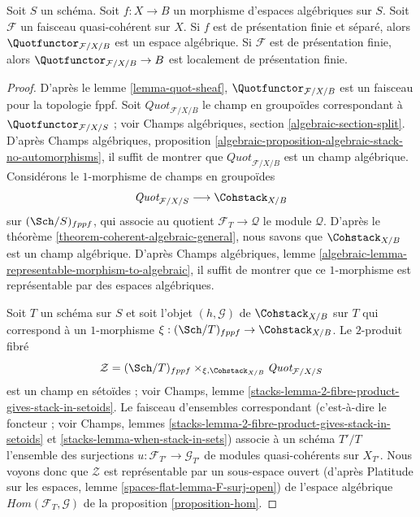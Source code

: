 \begin{proposition}
\label{proposition-quot}
Soit $S$ un schéma. Soit $f : X \to B$ un morphisme d'espaces algébriques sur
$S$. Soit $\mathcal{F}$ un faisceau quasi-cohérent sur $X$. Si $f$ est de
présentation finie et séparé, alors
$\Quotfunctor_{\mathcal{F}/X/B}$ est un espace algébrique. Si $\mathcal{F}$
est de présentation finie, alors
$\Quotfunctor_{\mathcal{F}/X/B} \to B$ est localement de présentation finie.
\end{proposition}

\begin{proof}
D'après le lemme \ref{lemma-quot-sheaf},
$\Quotfunctor_{\mathcal{F}/X/B}$ est un faisceau pour la topologie fppf. Soit
$\textit{Quot}_{\mathcal{F}/X/B}$ le champ en groupoïdes correspondant à
$\Quotfunctor_{\mathcal{F}/X/S}$ ; voir Champs algébriques, section
\ref{algebraic-section-split}. D'après Champs algébriques, proposition
\ref{algebraic-proposition-algebraic-stack-no-automorphisms}, il suffit de
montrer que $\textit{Quot}_{\mathcal{F}/X/B}$ est un champ algébrique.
Considérons le $1$-morphisme de champs en groupoïdes
$$
\textit{Quot}_{\mathcal{F}/X/S}
\longrightarrow
\Cohstack_{X/B}
$$
sur $(\Sch/S)_{fppf}$, qui associe au quotient
$\mathcal{F}_T \to \mathcal{Q}$ le module $\mathcal{Q}$. D'après le théorème
\ref{theorem-coherent-algebraic-general}, nous savons que
$\Cohstack_{X/B}$ est un champ algébrique. D'après Champs algébriques, lemme
\ref{algebraic-lemma-representable-morphism-to-algebraic}, il suffit de montrer
que ce $1$-morphisme est représentable par des espaces algébriques.

\medskip\noindent
Soit $T$ un schéma sur $S$ et soit l'objet $(h, \mathcal{G})$ de
$\Cohstack_{X/B}$ sur $T$ qui correspond à un $1$-morphisme
$\xi : (\Sch/T)_{fppf} \to \Cohstack_{X/B}$. Le $2$-produit fibré
$$
\mathcal{Z} =
(\Sch/T)_{fppf}
\times_{\xi, \Cohstack_{X/B}}
\textit{Quot}_{\mathcal{F}/X/S}
$$
est un champ en sétoïdes ; voir Champs, lemme
\ref{stacks-lemma-2-fibre-product-gives-stack-in-setoids}. Le faisceau
d'ensembles correspondant (c'est-à-dire le foncteur ; voir Champs, lemmes
\ref{stacks-lemma-2-fibre-product-gives-stack-in-setoids} et
\ref{stacks-lemma-when-stack-in-sets}) associe à un schéma $T'/T$ l'ensemble
des surjections $u : \mathcal{F}_{T'} \to \mathcal{G}_{T'}$ de modules
quasi-cohérents sur $X_{T'}$. Nous voyons donc que $\mathcal{Z}$ est
représentable par un sous-espace ouvert (d'après Platitude sur les espaces,
lemme \ref{spaces-flat-lemma-F-surj-open}) de l'espace algébrique
$\mathit{Hom}(\mathcal{F}_T, \mathcal{G})$ de la proposition
\ref{proposition-hom}.
\end{proof}

